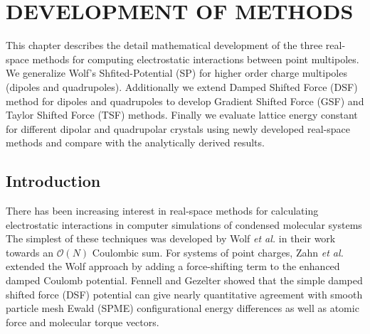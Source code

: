 %
%
%
%
%
%
%
%
%
%

%
%

\chapter{DEVELOPMENT OF METHODS}
\label{chap:development}
This chapter describes the detail mathematical development of the three real-space methods for computing electrostatic interactions between point multipoles. We generalize Wolf's Shfited-Potential (SP) for higher order charge multipoles (dipoles and quadrupoles). Additionally we extend Damped Shifted Force (DSF) method for dipoles and quadrupoles to develop Gradient Shifted Force (GSF) and Taylor Shifted Force (TSF) methods. Finally we evaluate lattice energy constant for different dipolar and quadrupolar crystals using newly developed real-space methods and compare with the analytically derived results.

\section{Introduction}
There has been increasing interest in real-space methods for
calculating electrostatic interactions in computer simulations of
condensed molecular systems \cite{Wolf99,Zahn02,Kast03,Beck05,Ma05,Gezelter06,Chen04,Chen06,Rodgers06,Denesyuk08,Izvekov08}
The simplest of these techniques was developed by Wolf {\it et al.}
in their work towards an $\mathcal{O}(N)$ Coulombic sum.\cite{Wolf99}
For systems of point charges, Zahn {\it et al.} extended the Wolf
approach by adding a force-shifting term to the enhanced damped
Coulomb potential.\cite{Zahn02,Kast03} Fennell and Gezelter showed
that the simple damped shifted force (DSF) potential can give nearly
quantitative agreement with smooth particle mesh Ewald
(SPME)\cite{Essmann95} configurational energy differences as well as
atomic force and molecular torque vectors.\cite{Gezelter06}

